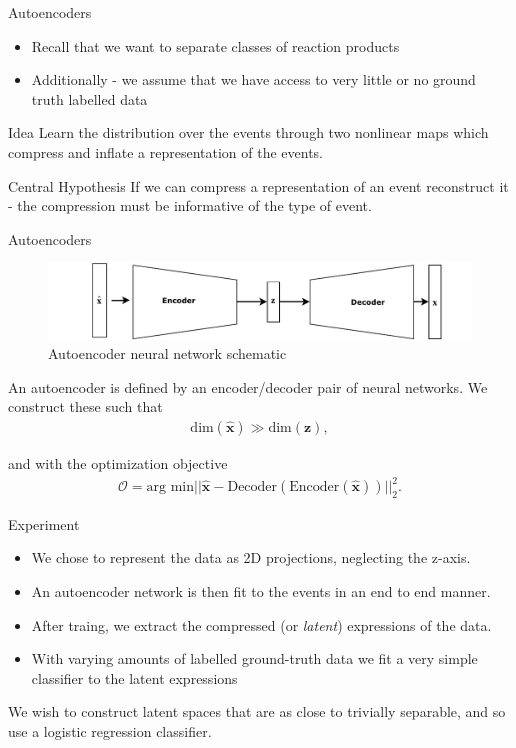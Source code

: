 \documentclass{beamer}
\begin{document}
\begin{frame}[t]{Autoencoders}
	\begin{itemize}
		\item Recall that we want to separate classes of reaction products
		\item Additionally - we assume that we have access to very little or no ground truth labelled data
	\end{itemize}
	\begin{block}{ Idea }
		Learn the distribution over the events through two nonlinear maps which compress and inflate a representation of the events.
	\end{block}
	\begin{block}{Central Hypothesis}
		If we can compress a representation of an event reconstruct it - the compression must be informative of the type of event.
	\end{block}
\end{frame}

\begin{frame}[t]{Autoencoders}
	\begin{figure}[h]
		\centering
		\includegraphics[width=0.8\linewidth]{../chapters/theory/autoencoder/plots/autoencoder.pdf}
		\caption{Autoencoder neural network schematic}%
		\label{fig:autoenc}
	\end{figure}

	An autoencoder is defined by an encoder/decoder pair of neural networks. We construct these such that 
	\begin{align}
		\text{dim}(\mathbf{\hat{x}}) \gg \text{dim}(\mathbf{z}),
	\end{align}

	and with the optimization objective
	\begin{align}
		\mathcal{O} = \text{arg min} || \mathbf{\hat{x}} - \text{Decoder}(\text{Encoder}(\mathbf{\hat{x}}))||_2 ^2.
	\end{align}
\end{frame}

\begin{frame}[t]{Experiment}
	\begin{itemize}
		\item We chose to represent the data as 2D projections, neglecting the z-axis.
		\item An autoencoder network is then fit to the events in an end to end manner.
		\item After traing, we extract the compressed (or \textit{latent}) expressions of the data.
		\item With varying amounts of labelled ground-truth data we fit a very simple classifier to the latent expressions
	\end{itemize}
	We wish to construct latent spaces that are as close to trivially separable, and so use a logistic regression classifier.
\end{frame}
\end{document}
